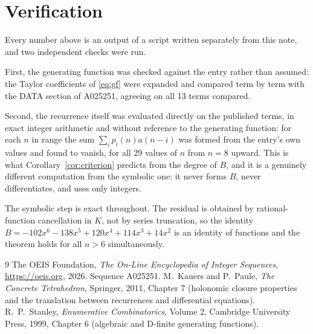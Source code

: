\documentclass[11pt,a4paper]{article}
\theoremstyle{plain}
\theoremstyle{definition}
\begin{document}
\section{Verification}

Every number above is an output of a script written separately from this note, and two
independent checks were run.

First, the generating function was checked against the entry rather than assumed: the
Taylor coefficients of \eqref{eq:gf} were expanded and compared term by term with the DATA
section of A025251, agreeing on all 13 terms compared.

Second, the recurrence itself was evaluated directly on the published terms, in exact
integer arithmetic and without reference to the generating function: for each $n$ in range
the sum $\sum_{i}p_{i}(n)a(n-i)$ was formed from the entry's own values and found to
vanish, for all 29 values of $n$ from $n=8$ upward. This is what
Corollary~\ref{cor:criterion} predicts from the degree of $B$, and it is a genuinely
different computation from the symbolic one: it never forms $B$, never differentiates, and
uses only integers.

The symbolic step is exact throughout. The residual is obtained by rational-function
cancellation in $K$, not by series truncation, so the identity $B=- 102 x^{6} - 138 x^{5} + 120 x^{4} + 114 x^{3} + 14 x^{2}$ is an
identity of functions and the theorem holds for all $n>6$ simultaneously.

\begin{thebibliography}{9}
 The OEIS Foundation, \emph{The On-Line Encyclopedia of Integer Sequences},
\url{https://oeis.org}, 2026. Sequence A025251.
 M.~Kauers and P.~Paule, \emph{The Concrete Tetrahedron}, Springer, 2011,
Chapter 7 (holonomic closure properties and the translation between recurrences and
differential equations).
 R.~P.~Stanley, \emph{Enumerative Combinatorics}, Volume 2, Cambridge
University Press, 1999, Chapter 6 (algebraic and D-finite generating functions).
\end{thebibliography}
\end{document}
